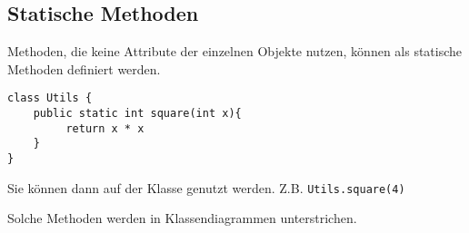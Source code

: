 \documentclass[a4paper]{scrartcl}
\begin{document}
\subsection*{Statische Methoden}

Methoden, die keine Attribute der einzelnen Objekte nutzen, können als statische Methoden definiert werden. 
\begin{verbatim}
class Utils {
    public static int square(int x){
         return x * x
    }
}
\end{verbatim}

Sie können dann auf der Klasse genutzt werden. Z.B. \texttt{Utils.square(4)}

Solche Methoden werden in Klassendiagrammen unterstrichen.
\begin{center}
\end{center}
\end{document}
